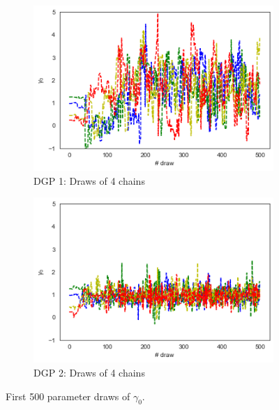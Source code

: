 \begin{figure}[H]
  \centering
  \begin{subfigure}{0.4\linewidth}
    \includegraphics[width=\linewidth]{graphics/convergence_1}
    \caption{DGP 1: Draws of 4 chains}
  \end{subfigure}
  \begin{subfigure}{0.4\linewidth}
    \includegraphics[width=\linewidth]{graphics/convergence}
    \caption{DGP 2: Draws of 4 chains}
  \end{subfigure}
  \caption{First 500 parameter draws of $\gamma_0$.}
  \label{fig:convergence}
\end{figure}


